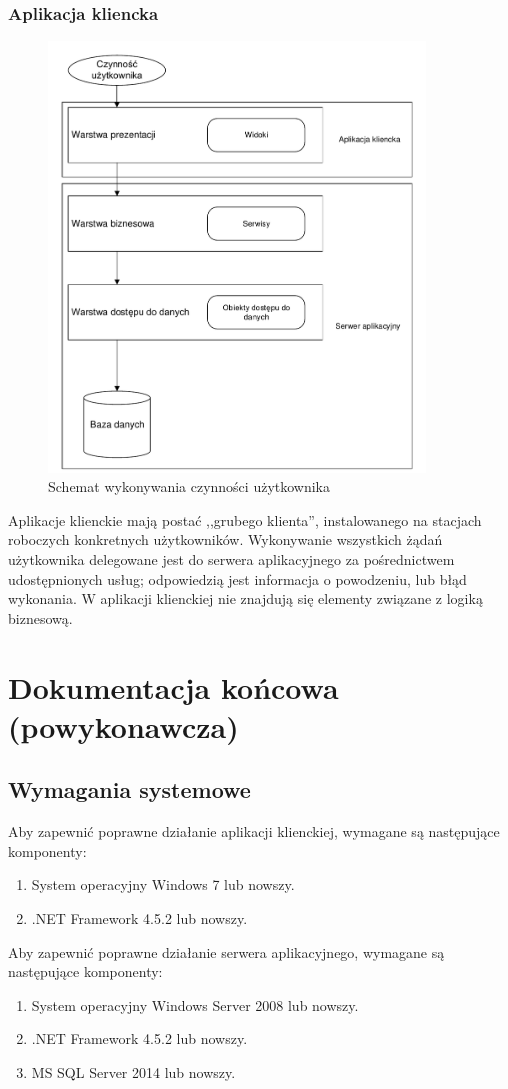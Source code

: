 \documentclass[10pt,a4paper]{article}
\begin{document}
\subsubsection{Aplikacja kliencka}
\begin{figure}[H]
	\centering
	\includegraphics[width=10cm]{architecture-fat-client.pdf}
	\caption{Schemat wykonywania czynności użytkownika}
\end{figure}
Aplikacje klienckie mają postać ,,grubego klienta'', instalowanego na stacjach roboczych konkretnych użytkowników. Wykonywanie wszystkich żądań użytkownika delegowane jest do serwera aplikacyjnego za pośrednictwem udostępnionych usług; odpowiedzią jest informacja o powodzeniu, lub błąd wykonania. W aplikacji klienckiej nie znajdują się elementy związane z logiką biznesową.

\newpage
\section{Dokumentacja końcowa (powykonawcza)}

\subsection{Wymagania systemowe}
Aby zapewnić poprawne działanie aplikacji klienckiej, wymagane są następujące komponenty:
\begin{enumerate}
	\item System operacyjny Windows 7 lub nowszy.
	\item .NET Framework 4.5.2 lub nowszy.
\end{enumerate}
Aby zapewnić poprawne działanie serwera aplikacyjnego, wymagane są następujące komponenty:
\begin{enumerate}
	\item System operacyjny Windows Server 2008 lub nowszy.
	\item .NET Framework 4.5.2 lub nowszy.
	\item MS SQL Server 2014 lub nowszy.
\end{enumerate}
\end{document}

